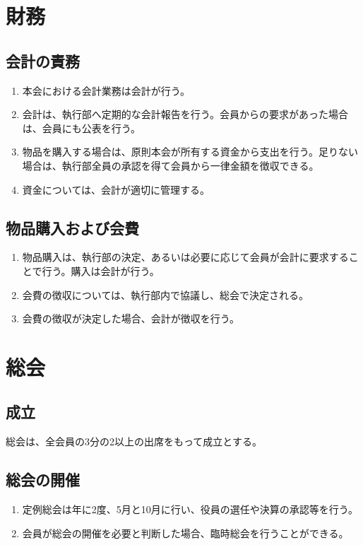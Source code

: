 \documentclass{jsreport}
\begin{document}
\chapter{財務}
\section{会計の責務}
\begin{enumerate}
    \item 本会における会計業務は会計が行う。
    \item 会計は、執行部へ定期的な会計報告を行う。会員からの要求があった場合は、会員にも公表を行う。
    \item 物品を購入する場合は、原則本会が所有する資金から支出を行う。足りない場合は、執行部全員の承認を得て会員から一律金額を徴収できる。
    \item 資金については、会計が適切に管理する。
\end{enumerate}

\section{物品購入および会費}
\begin{enumerate}
    \item 物品購入は、執行部の決定、あるいは必要に応じて会員が会計に要求することで行う。購入は会計が行う。
    \item 会費の徴収については、執行部内で協議し、総会で決定される。
    \item 会費の徴収が決定した場合、会計が徴収を行う。
\end{enumerate}

\chapter{総会}
\section{成立}
総会は、全会員の3分の2以上の出席をもって成立とする。

\section{総会の開催}
\begin{enumerate}
    \item 定例総会は年に2度、5月と10月に行い、役員の選任や決算の承認等を行う。
    \item 会員が総会の開催を必要と判断した場合、臨時総会を行うことができる。
\end{enumerate}
\end{document}
